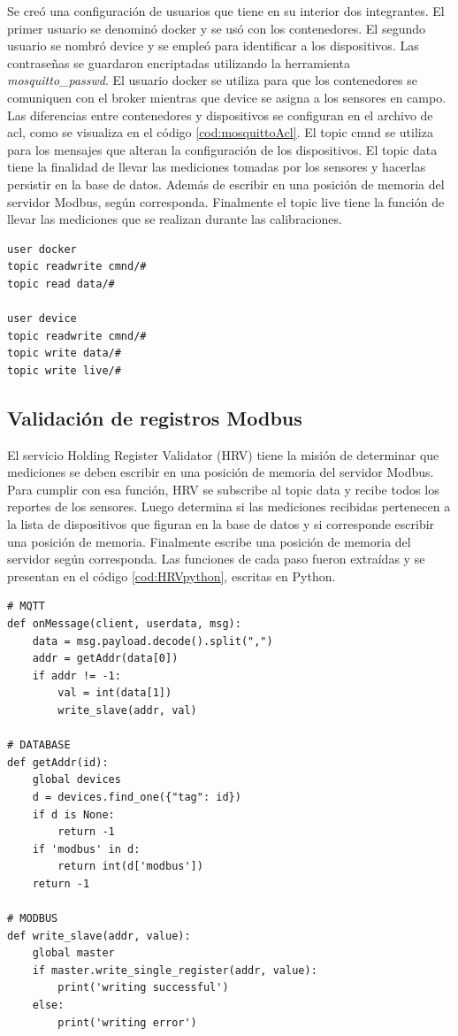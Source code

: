 Se creó una configuración de usuarios que tiene en su interior dos integrantes.
El primer usuario se denominó docker y se usó con los contenedores.
El segundo usuario se nombró device y se empleó para identificar a los dispositivos.
Las contraseñas se guardaron encriptadas utilizando la herramienta \emph{mosquitto\_passwd}.
El usuario docker se utiliza para que los contenedores se comuniquen con el broker mientras que device se asigna a los sensores en campo.
Las diferencias entre contenedores y dispositivos se configuran en el archivo de acl, como se visualiza en el código \ref{cod:mosquittoAcl}.
El topic cmnd se utiliza para los mensajes que alteran la configuración de los dispositivos.
El topic data tiene la finalidad de llevar las mediciones tomadas por los sensores y hacerlas persistir en la base de datos.
Además de escribir en una posición de memoria del servidor Modbus, según corresponda.
Finalmente el topic live tiene la función de llevar las mediciones que se realizan durante las calibraciones.

\newpage

\begin{lstlisting}[label=cod:mosquittoAcl,caption=Lista de control de acceso]
user docker
topic readwrite cmnd/#
topic read data/#

user device
topic readwrite cmnd/#
topic write data/#
topic write live/#
\end{lstlisting}

\subsection{Validación de registros Modbus}

El servicio Holding Register Validator (HRV) tiene la misión de determinar que mediciones se deben escribir en una posición de memoria del servidor Modbus.
Para cumplir con esa función, HRV se subscribe al topic data y recibe todos los reportes de los sensores.
Luego determina si las mediciones recibidas pertenecen a la lista de dispositivos que figuran en la base de datos y si corresponde escribir una posición de memoria.
Finalmente escribe una posición de memoria del servidor según corresponda.
Las funciones de cada paso fueron extraídas y se presentan en el código \ref{cod:HRVpython}, escritas en Python.


\begin{lstlisting}[label=cod:HRVpython,caption=Funciones principales del servicio HRV]
# MQTT
def onMessage(client, userdata, msg):
    data = msg.payload.decode().split(",")
    addr = getAddr(data[0])
    if addr != -1:
        val = int(data[1])
        write_slave(addr, val)
        
# DATABASE
def getAddr(id):
    global devices
    d = devices.find_one({"tag": id})
    if d is None:
        return -1
    if 'modbus' in d:
        return int(d['modbus'])
    return -1

# MODBUS
def write_slave(addr, value):
    global master
    if master.write_single_register(addr, value):
        print('writing successful')
    else:
        print('writing error')
\end{lstlisting}

